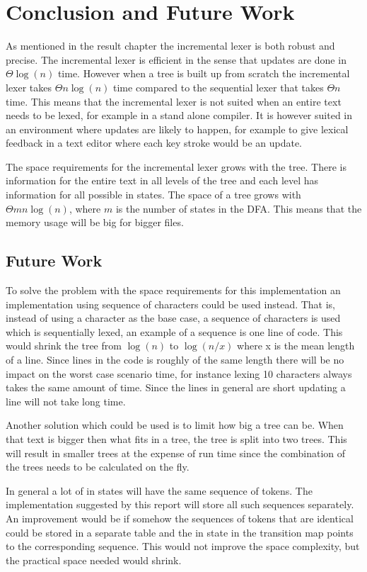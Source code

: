\chapter{Conclusion and Future Work}
As mentioned in the result chapter the incremental lexer is both robust and
precise. The incremental lexer is efficient in the sense that updates are done
in $\Theta \log(n)$ time. However when a tree is built up from scratch the
incremental lexer takes $\Theta n\log(n)$ time compared to the sequential lexer
that takes $\Theta n$ time. This means that the incremental lexer is not suited
when an entire text needs to be lexed, for example in a stand alone compiler. It
is however suited in an environment where updates are likely to happen, for
example to give lexical feedback in a text editor where each key stroke would be
an update.

The space requirements for the incremental lexer grows with the tree. There is
information for the entire text in all levels of the tree and each level has
information for all possible in states. The space of a tree grows with
$\Theta mn\log(n)$, where $m$ is the number of states in the DFA. This means
that the memory usage will be big for bigger files.

\section{Future Work}
To solve the problem with the space requirements for this implementation an
implementation using sequence of characters could be used instead. That is,
instead of using a character as the base case, a sequence of characters is used
which is sequentially lexed, an example of a sequence is one line of code. This
would shrink the tree from $\log(n)$ to $\log(n/x)$ where x is the mean length
of a line. Since lines in the code is roughly of the same length there will be
no impact on the worst case scenario time, for instance lexing 10 characters
always takes the same amount of time. Since the lines in general are short
updating a line will not take long time.

Another solution which could be used is to limit how big a tree can be. When
that text is bigger then what fits in a tree, the tree is split into two trees.
This will result in smaller trees at the expense of run time since the
combination of the trees needs to be calculated on the fly.

In general a lot of in states will have the same sequence of tokens. The
implementation suggested by this report will store all such sequences separately.
An improvement would be if somehow the sequences of tokens that are identical
could be stored in a separate table and the in state in the transition map points
to the corresponding sequence. This would not improve the space complexity, but
the practical space needed would shrink.
